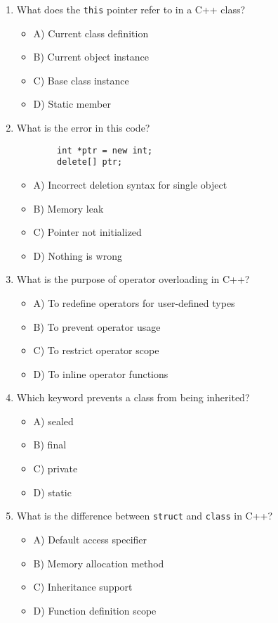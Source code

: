 \documentclass[a4paper,12pt]{article}
\begin{document}
\begin{enumerate}
    \item What does the \verb|this| pointer refer to in a C++ class?
    \begin{itemize}
        \item A) Current class definition
        \item B) Current object instance
        \item C) Base class instance
        \item D) Static member
    \end{itemize}

    \item What is the error in this code?

    \lstset{language=C++}
    \begin{lstlisting}
        int *ptr = new int;
        delete[] ptr;
    \end{lstlisting}
    
    \begin{itemize}
        \item A) Incorrect deletion syntax for single object
        \item B) Memory leak
        \item C) Pointer not initialized
        \item D) Nothing is wrong
    \end{itemize}

    \item What is the purpose of operator overloading in C++?
    \begin{itemize}
        \item A) To redefine operators for user-defined types
        \item B) To prevent operator usage
        \item C) To restrict operator scope
        \item D) To inline operator functions
    \end{itemize}

    \item Which keyword prevents a class from being inherited?
    \begin{itemize}
        \item A) sealed
        \item B) final
        \item C) private
        \item D) static
    \end{itemize}

    \item What is the difference between \verb|struct| and \verb|class| in C++?
    \begin{itemize}
        \item A) Default access specifier
        \item B) Memory allocation method
        \item C) Inheritance support
        \item D) Function definition scope
    \end{itemize}


\end{enumerate}
\end{document}
